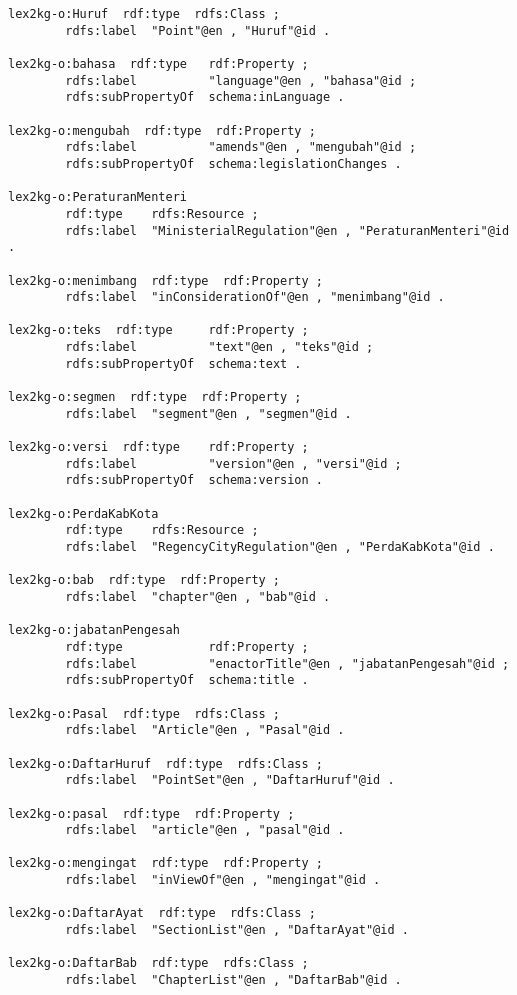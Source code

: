 \begin{lstlisting}
lex2kg-o:Huruf  rdf:type  rdfs:Class ;
        rdfs:label  "Point"@en , "Huruf"@id .

lex2kg-o:bahasa  rdf:type   rdf:Property ;
        rdfs:label          "language"@en , "bahasa"@id ;
        rdfs:subPropertyOf  schema:inLanguage .

lex2kg-o:mengubah  rdf:type  rdf:Property ;
        rdfs:label          "amends"@en , "mengubah"@id ;
        rdfs:subPropertyOf  schema:legislationChanges .

lex2kg-o:PeraturanMenteri
        rdf:type    rdfs:Resource ;
        rdfs:label  "MinisterialRegulation"@en , "PeraturanMenteri"@id .

lex2kg-o:menimbang  rdf:type  rdf:Property ;
        rdfs:label  "inConsiderationOf"@en , "menimbang"@id .

lex2kg-o:teks  rdf:type     rdf:Property ;
        rdfs:label          "text"@en , "teks"@id ;
        rdfs:subPropertyOf  schema:text .

lex2kg-o:segmen  rdf:type  rdf:Property ;
        rdfs:label  "segment"@en , "segmen"@id .

lex2kg-o:versi  rdf:type    rdf:Property ;
        rdfs:label          "version"@en , "versi"@id ;
        rdfs:subPropertyOf  schema:version .

lex2kg-o:PerdaKabKota
        rdf:type    rdfs:Resource ;
        rdfs:label  "RegencyCityRegulation"@en , "PerdaKabKota"@id .

lex2kg-o:bab  rdf:type  rdf:Property ;
        rdfs:label  "chapter"@en , "bab"@id .

lex2kg-o:jabatanPengesah
        rdf:type            rdf:Property ;
        rdfs:label          "enactorTitle"@en , "jabatanPengesah"@id ;
        rdfs:subPropertyOf  schema:title .

lex2kg-o:Pasal  rdf:type  rdfs:Class ;
        rdfs:label  "Article"@en , "Pasal"@id .

lex2kg-o:DaftarHuruf  rdf:type  rdfs:Class ;
        rdfs:label  "PointSet"@en , "DaftarHuruf"@id .

lex2kg-o:pasal  rdf:type  rdf:Property ;
        rdfs:label  "article"@en , "pasal"@id .

lex2kg-o:mengingat  rdf:type  rdf:Property ;
        rdfs:label  "inViewOf"@en , "mengingat"@id .

lex2kg-o:DaftarAyat  rdf:type  rdfs:Class ;
        rdfs:label  "SectionList"@en , "DaftarAyat"@id .

lex2kg-o:DaftarBab  rdf:type  rdfs:Class ;
        rdfs:label  "ChapterList"@en , "DaftarBab"@id .


\end{lstlisting}
